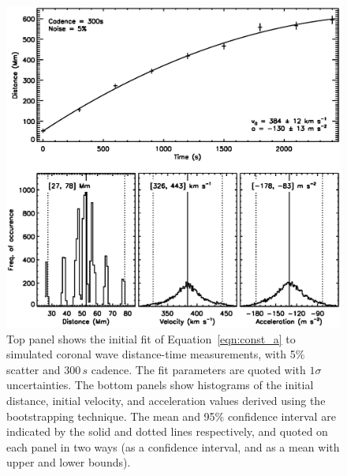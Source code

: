 \documentclass[structabstract]{aa}
\begin{document}
\begin{figure}
\begin{center}
\includegraphics[scale=0.45, trim=20 50 0 0, clip=true]{images/cad_boot_weight_5percent_300s.eps}
\caption{Top panel shows the initial fit of Equation~\ref{eqn:const_a} to simulated coronal wave distance-time measurements, with 5\% scatter and $300\,s$ cadence. The fit parameters are quoted with $1\sigma$ uncertainties. The bottom panels show histograms of the initial distance, initial velocity, and acceleration values derived using the bootstrapping technique. The mean and 95\% confidence interval are indicated by the solid and dotted lines respectively, and quoted on each panel in two ways (as a confidence interval, and as a mean with upper and lower bounds).}
\label{cad_boot_weight}
\end{center}
\end{figure}
\end{document}
